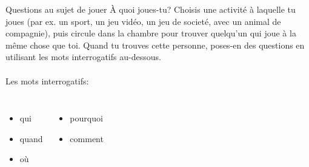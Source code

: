 \begin{frame}{Questions au sujet de jouer}
  À quoi joues-tu?
  Choisis une activité à laquelle tu joues (par ex. un sport, un jeu vidéo, un jeu de societé, avec un animal de compagnie), puis circule dans la chambre pour trouver quelqu'un qui joue à la même chose que toi.
  Quand tu trouves cette personne, poses-en des questions en utilisant les mots interrogatifs au-dessous. \\
   \\
  Les mots interrogatifs:
  \begin{columns}[t]
      \begin{itemize}
        \item qui
        \item quand
        \item où
      \end{itemize}
      \begin{itemize}
        \item pourquoi
        \item comment
      \end{itemize}
  \end{columns}
\end{frame}